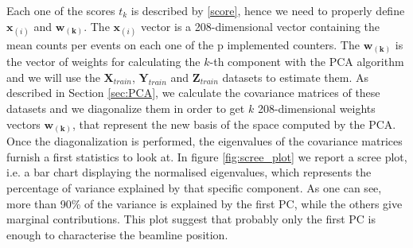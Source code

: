 Each one of the scores $t_k$ is described by \eqref{score}, hence we need to properly define $\mathbf{x}_{(i)}$ and $\mathbf{w_{(k)}}$. The $\mathbf{x}_{(i)}$ vector is a 208-dimensional vector containing the mean counts per events on each one of the p implemented counters. The  $\mathbf{w_{(k)}}$ is the vector of weights for calculating the $k$-th component with the PCA algorithm and we will use the $\mathbf{X}_{train}$, $\mathbf{Y}_{train}$ and $\mathbf{Z}_{train}$ datasets to estimate them. As described in Section \ref{sec:PCA}, we calculate the covariance matrices of these datasets and we diagonalize them in order to get $k$ 208-dimensional weights vectors $\mathbf{w_{(k)}}$, that represent the new basis of the space computed by the PCA. 
Once the diagonalization is performed, the eigenvalues of the covariance matrices furnish a first statistics to look at. In figure \ref{fig:scree_plot} we report a scree plot, i.e. a bar chart displaying the normalised eigenvalues, which represents the percentage of variance explained by that specific component. As one can see, more than 90\% of the variance is explained by the first PC, while the others give marginal contributions. This plot suggest that probably only the first PC is enough to characterise the beamline position.
